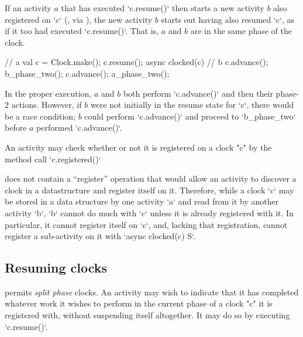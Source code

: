 If an activity {$a$} that has executed \xcd`c.resume()` then starts a
new activity {$b$} also registered on \xcd`c` (\eg, via ), the new activity {$b$} starts out having also resumed
\xcd`c`, as if it too had executed \xcd`c.resume()`. That is, $a$ and {$b$}
are in the same phase of the clock. 
\begin{xten}
// a
val c = Clock.make();
c.resume();
async clocked(c) {
  // b
  c.advance();
  b_phase_two();
}
c.advance();
a_phase_two();
\end{xten}
In the proper execution, {$a$} and {$b$} both perform
\xcd`c.advance()` and then their phase-2 actions.  
However, if {$b$} were not
initially in the resume state for \xcd`c`, there would be a race condition;
{$b$} could perform \xcd`c.advance()` and proceed to \xcd`b_phase_two`
before {$a$} performed \xcd`c.advance()`.


An activity may check whether or not it is registered on a clock \xcd"c" by
the method call \xcd`c.registered()`


\begin{note}
\Xten{} does not contain a ``register'' operation that would allow an activity
to discover a clock in a datastructure and register itself on it. Therefore,
while a clock \xcd`c` may be stored in a data structure by one activity
\xcd`a` and read from it by another activity \xcd`b`, \xcd`b` cannot do much
with \xcd`c` unless it is already registered with it.  In particular, it
cannot register itself on \xcd`c`, and, lacking that registration, cannot
register a sub-activity on it with \xcd`async clocked(c) S`.
\end{note}


\subsection{Resuming clocks}\label{resume}\label{sec:clock:resume}
\Xten{} permits {\em split phase} clocks. An activity may wish
to indicate that it has completed whatever work it wishes to perform
in the current phase of a  clock \xcd"c" it is registered with, without
suspending itself altogether. It may do so  by executing 
\xcd`c.resume()`.



